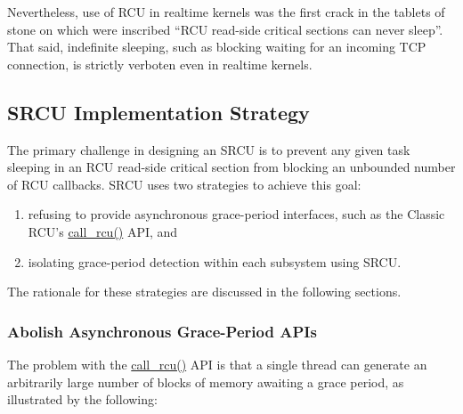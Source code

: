 Nevertheless,
use of RCU in realtime kernels was the first crack in the tablets
of stone on which were inscribed ``RCU read-side critical sections can never
sleep''.
That said, indefinite sleeping, such as blocking waiting for an
incoming TCP connection, is strictly verboten even in realtime kernels.

 \QuickQuizEnd

 \QuickQuizEnd

\subsection{SRCU Implementation Strategy}
\label{sec:app:rcuimpl:SRCU Implementation Strategy}

The primary challenge in designing an SRCU
is to prevent any given task sleeping in an RCU read-side
critical section from blocking an unbounded number of RCU callbacks.
SRCU uses two strategies to achieve this goal:
\begin{enumerate}
\item	refusing to provide asynchronous grace-period interfaces,
	such as the Classic RCU's \url{call_rcu()} API, and
\item	isolating grace-period detection within each subsystem using SRCU.
\end{enumerate}
The rationale for these strategies are discussed in the following sections.

\subsubsection{Abolish Asynchronous Grace-Period APIs}
\label{sec:app:rcuimpl:Abolish Asynchronous Grace-Period APIs}

The problem with the \url{call_rcu()} API is that a single thread can
generate an arbitrarily large number of blocks of memory awaiting a
grace period, as illustrated by the following:

